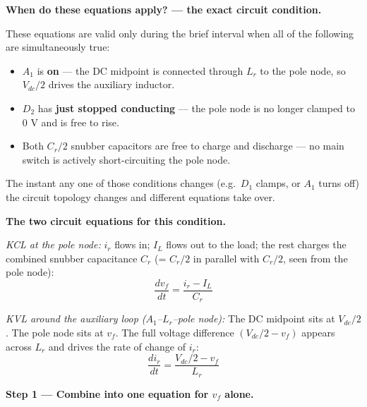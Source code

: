 \documentclass[12pt, a4paper]{article}
\def\,{ }%
\newcommand{\Vdc}{V_{dc}}
\newcommand{\vf}{v_f}
\newcommand{\ir}{i_r}
\newcommand{\IL}{I_L}
\newcommand{\Lr}{L_r}
\newcommand{\Cr}{C_r}
\begin{document}
\begin{eqnbox}
\textbf{When do these equations apply? — the exact circuit condition.}

These equations are valid only during the brief interval when all of the
following are simultaneously true:
\begin{itemize}
    \item $A_1$ is \textbf{on} — the DC midpoint is connected through $\Lr$
          to the pole node, so $\Vdc/2$ drives the auxiliary inductor.
    \item $D_2$ has \textbf{just stopped conducting} — the pole node is no
          longer clamped to 0\,V and is free to rise.
    \item Both $\Cr/2$ snubber capacitors are free to charge and discharge —
          no main switch is actively short-circuiting the pole node.
\end{itemize}
The instant any one of those conditions changes (e.g.\ $D_1$ clamps, or
$A_1$ turns off) the circuit topology changes and different equations take
over.

\medskip
\textbf{The two circuit equations for this condition.}

\textit{KCL at the pole node:}
$\ir$ flows in; $\IL$ flows out to the load; the rest charges the combined
snubber capacitance $\Cr$ (= $\Cr/2$ in parallel with $\Cr/2$, seen from
the pole node):
\begin{equation}
    \frac{d\vf}{dt} = \frac{\ir - \IL}{\Cr}
    \label{eq:dvf_dt}
\end{equation}

\textit{KVL around the auxiliary loop ($A_1$--$\Lr$--pole\,node):}
The DC midpoint sits at $\Vdc/2$.
The pole node sits at $\vf$.
The full voltage difference $(\Vdc/2 - \vf)$ appears across $\Lr$ and
drives the rate of change of $\ir$:
\begin{equation}
    \frac{d\ir}{dt} = \frac{\Vdc/2 - \vf}{\Lr}
    \label{eq:dir_dt}
\end{equation}

\medskip
\textbf{Step 1 — Combine into one equation for $\vf$ alone.}


\end{eqnbox}
\end{document}

